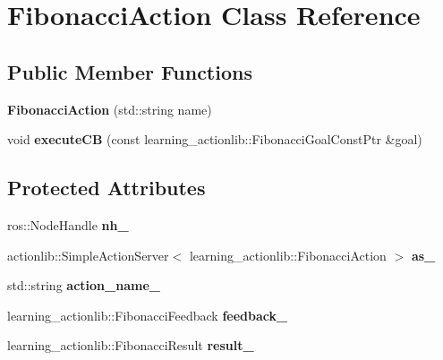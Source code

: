 \hypertarget{classFibonacciAction}{}\section{Fibonacci\+Action Class Reference}
\label{classFibonacciAction}
\subsection*{Public Member Functions}
\begin{DoxyCompactItemize}
\item 
{\bfseries Fibonacci\+Action} (std\+::string name)\hypertarget{classFibonacciAction_a48bacb750276489375d1701a88361005}{}\label{classFibonacciAction_a48bacb750276489375d1701a88361005}

\item 
void {\bfseries execute\+CB} (const learning\+\_\+actionlib\+::\+Fibonacci\+Goal\+Const\+Ptr \&goal)\hypertarget{classFibonacciAction_a580d169d7247190cab5c3e30a3fa4eba}{}\label{classFibonacciAction_a580d169d7247190cab5c3e30a3fa4eba}

\end{DoxyCompactItemize}
\subsection*{Protected Attributes}
\begin{DoxyCompactItemize}
\item 
ros\+::\+Node\+Handle {\bfseries nh\+\_\+}\hypertarget{classFibonacciAction_ae5414664ec28f5f7a30ca0fbd5e549fd}{}\label{classFibonacciAction_ae5414664ec28f5f7a30ca0fbd5e549fd}

\item 
actionlib\+::\+Simple\+Action\+Server$<$ learning\+\_\+actionlib\+::\+Fibonacci\+Action $>$ {\bfseries as\+\_\+}\hypertarget{classFibonacciAction_a1a56c6e35dbc90a074c6ea776cd4e156}{}\label{classFibonacciAction_a1a56c6e35dbc90a074c6ea776cd4e156}

\item 
std\+::string {\bfseries action\+\_\+name\+\_\+}\hypertarget{classFibonacciAction_a731200d9b889f6f08492516c82540ea9}{}\label{classFibonacciAction_a731200d9b889f6f08492516c82540ea9}

\item 
learning\+\_\+actionlib\+::\+Fibonacci\+Feedback {\bfseries feedback\+\_\+}\hypertarget{classFibonacciAction_ab688819d38923de216245ce1fa8bf904}{}\label{classFibonacciAction_ab688819d38923de216245ce1fa8bf904}

\item 
learning\+\_\+actionlib\+::\+Fibonacci\+Result {\bfseries result\+\_\+}\hypertarget{classFibonacciAction_af1dbb9c7243859c1378b1af6a5a98282}{}\label{classFibonacciAction_af1dbb9c7243859c1378b1af6a5a98282}

\end{DoxyCompactItemize}


